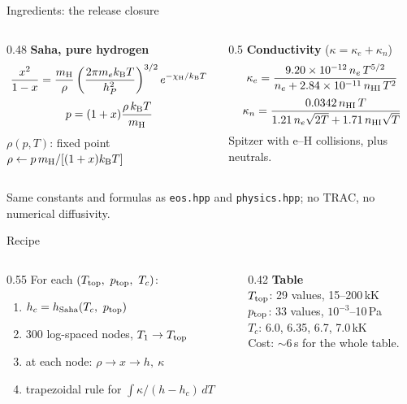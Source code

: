 \documentclass[aspectratio=169,10pt]{beamer}
\newcommand{\src}[1]{{\scriptsize\color{gray}#1}}
\newcommand{\ptop}{p_{\rm top}}
\newcommand{\Ttop}{T_{\rm top}}
\newcommand{\kB}{k_{\rm B}}
\newcommand{\mH}{m_{\rm H}}
\newcommand{\chiH}{\chi_{\rm H}}
\begin{document}
\begin{frame}{Ingredients: the release closure}
  \begin{columns}[T]
    \begin{column}{0.48\textwidth}
      \textbf{Saha, pure hydrogen}
      \[
        \frac{x^2}{1-x} = \frac{\mH}{\rho}
        \left(\frac{2\pi m_e\kB T}{h_P^2}\right)^{3/2} e^{-\chiH/\kB T}
      \]
      \[
        p = (1+x)\frac{\rho\,\kB T}{\mH}
      \]
      \small $\rho(p,T)$: fixed point
      $\rho \leftarrow p\,\mH/[(1+x)\kB T]$
    \end{column}
    \begin{column}{0.5\textwidth}
      \textbf{Conductivity} ($\kappa = \kappa_e + \kappa_n$)
      \[
        \kappa_e = \frac{9.20\times10^{-12}\,n_e\,T^{5/2}}
                        {n_e + 2.84\times10^{-11}\,n_{\rm HI}\,T^2}
      \]
      \[
        \kappa_n = \frac{0.0342\,n_{\rm HI}\,T}
          {1.21\,n_e\sqrt{2T} + 1.71\,n_{\rm HI}\sqrt{T}}
      \]
      \small Spitzer with e--H collisions, plus neutrals.
    \end{column}
  \end{columns}
  \vspace{8pt}
  \src{Same constants and formulas as \texttt{eos.hpp} and \texttt{physics.hpp};
       no TRAC, no numerical diffusivity.}
\end{frame}

\begin{frame}{Recipe}
  \begin{columns}[T]
    \begin{column}{0.55\textwidth}
      For each $(\Ttop,\ \ptop,\ T_c)$:
      \begin{enumerate}\itemsep6pt
        \item $h_c = h_{\rm Saha}(T_c,\ \ptop)$
        \item 300 log-spaced nodes, $T_1 \to \Ttop$
        \item at each node: $\rho \to x \to h,\ \kappa$
        \item trapezoidal rule for $\int \kappa/(h-h_c)\,dT$
      \end{enumerate}
    \end{column}
    \begin{column}{0.42\textwidth}
      \textbf{Table}\\[3pt]
      \small
      $\Ttop$: 29 values, 15--200\,kK\\
      $\ptop$: 33 values, $10^{-3}$--10\,Pa\\
      $T_c$: 6.0, 6.35, 6.7, 7.0\,kK\\[6pt]
      Cost: $\sim$6\,s for the whole table.
    \end{column}
  \end{columns}
\end{frame}
\end{document}
